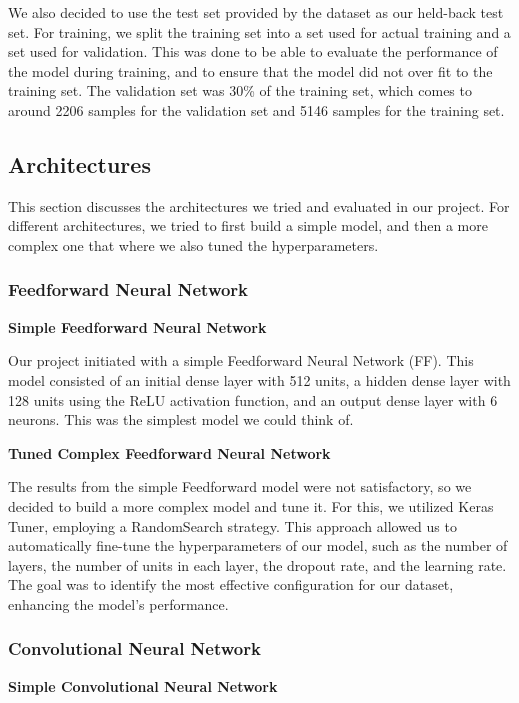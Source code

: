 We also decided to use the test set provided by the dataset as our held-back test set.
For training, we split the training set into a set used for actual training and a set used for validation.
This was done to be able to evaluate the performance of the model during training, and to ensure that the model did not over fit to the training set.
The validation set was 30\% of the training set, which comes to around 2206 samples for the validation set and 5146 samples for the training set.

\subsection{Architectures}\label{subsec:architectures}

This section discusses the architectures we tried and evaluated in our project.
For different architectures, we tried to first build a simple model, and then a more complex one that where we also tuned the hyperparameters.

\subsubsection{Feedforward Neural Network}

\textbf{Simple Feedforward Neural Network}

Our project initiated with a simple Feedforward Neural Network (FF).
This model consisted of an initial dense layer with 512 units, a hidden dense layer with 128 units using the ReLU activation function, and an output dense layer with 6 neurons.
This was the simplest model we could think of.

\textbf{Tuned Complex Feedforward Neural Network}

The results from the simple Feedforward model were not satisfactory, so we decided to build a more complex model and tune it.
For this, we utilized Keras Tuner, employing a RandomSearch strategy.
This approach allowed us to automatically fine-tune the hyperparameters of our model, such as the number of layers, the number of units in each layer, the dropout rate, and the learning rate.
The goal was to identify the most effective configuration for our dataset, enhancing the model's performance.

\subsubsection{Convolutional Neural Network}

\textbf{Simple Convolutional Neural Network}

